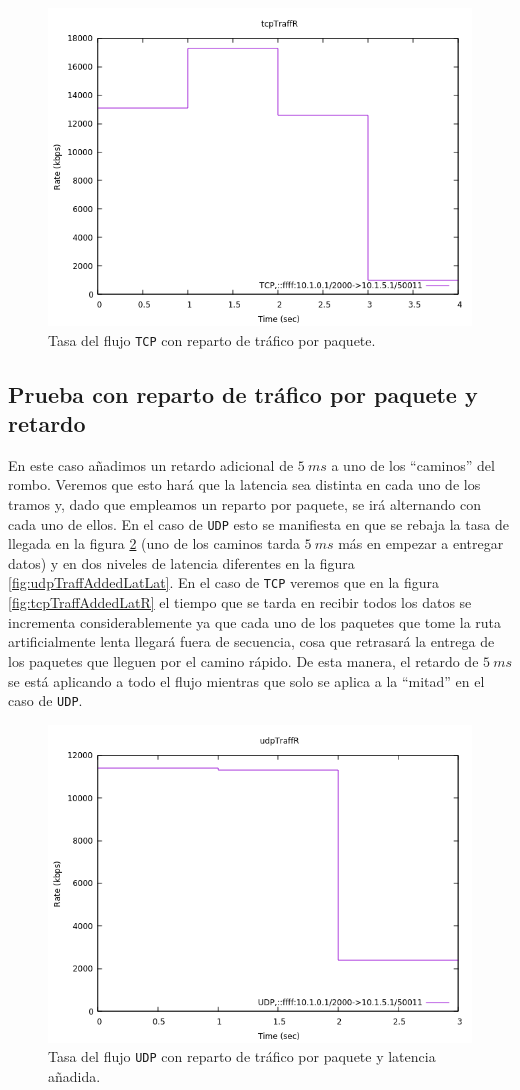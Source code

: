 \documentclass[11pt]{article}
\begin{document}
            \begin{figure}
                \centering
                \includegraphics[width=0.6\linewidth]{tcpTraffPPR.png}
                \caption{Tasa del flujo \texttt{TCP} con reparto de tráfico por paquete.}
                \label{fig:tcpTraffPPR}
            \end{figure}

        \subsection{Prueba con reparto de tráfico por paquete y retardo}
            En este caso añadimos un retardo adicional de $5\ ms$ a uno de los ``caminos'' del rombo. Veremos que esto hará que la latencia sea distinta en cada uno de los tramos y, dado que empleamos un reparto por paquete, se irá alternando con cada uno de ellos. En el caso de \texttt{UDP} esto se manifiesta en que se rebaja la tasa de llegada en la figura \ref{fig:udpTraffAddedLatR} (uno de los caminos tarda $5\ ms$ más en empezar a entregar datos) y en dos niveles de latencia diferentes en la figura \ref{fig:udpTraffAddedLatLat}. En el caso de \texttt{TCP} veremos que en la figura \ref{fig:tcpTraffAddedLatR} el tiempo que se tarda en recibir todos los datos se incrementa considerablemente ya que cada uno de los paquetes que tome la ruta artificialmente lenta llegará fuera de secuencia, cosa que retrasará la entrega de los paquetes que lleguen por el camino rápido. De esta manera, el retardo de $5\ ms$ se está aplicando a todo el flujo mientras que solo se aplica a la ``mitad'' en el caso de \texttt{UDP}.

            \begin{figure}
                \centering
                \includegraphics[width=0.6\linewidth]{udpTraffAddedLatR.png}
                \caption{Tasa del flujo \texttt{UDP} con reparto de tráfico por paquete y latencia añadida.}
                \label{fig:udpTraffAddedLatR}
            \end{figure}
\end{document}

